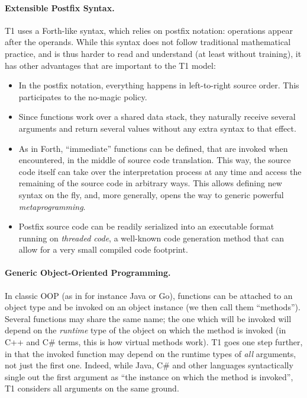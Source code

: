 \paragraph{Extensible Postfix Syntax.} T1 uses a Forth-like syntax, which
relies on postfix notation: operations appear after the operands. While
this syntax does not follow traditional mathematical practice, and is
thus harder to read and understand (at least without training), it has
other advantages that are important to the T1 model:
\begin{itemize}

    \item In the postfix notation, everything happens in left-to-right
    source order. This participates to the no-magic policy.

    \item Since functions work over a shared data stack, they naturally
    receive several arguments and return several values without any
    extra syntax to that effect.

    \item As in Forth, ``immediate'' functions can be defined, that are
    invoked when encountered, in the middle of source code translation.
    This way, the source code itself can take over the interpretation
    process at any time and access the remaining of the source code in
    arbitrary ways. This allows defining new syntax on the fly, and,
    more generally, opens the way to generic powerful
    \emph{metaprogramming}.

    \item Postfix source code can be readily serialized into an
    executable format running on \emph{threaded code}, a well-known code
    generation method that can allow for a very small compiled code
    footprint.

\end{itemize}

\paragraph{Generic Object-Oriented Programming.} In classic OOP (as in
for instance Java or Go), functions can be attached to an object type
and be invoked on an object instance (we then call them ``methods'').
Several functions may share the same name; the one which will be invoked
will depend on the \emph{runtime} type of the object on which the method
is invoked (in C++ and C\# terms, this is how virtual methods work). T1
goes one step further, in that the invoked function may depend on the
runtime types of \emph{all} arguments, not just the first one. Indeed,
while Java, C\# and other languages syntactically single out the first
argument as ``the instance on which the method is invoked'', T1
considers all arguments on the same ground.

